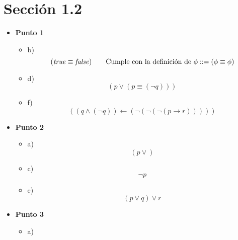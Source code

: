 \documentclass{article}
\begin{document}
\section{Sección 1.2}
\begin{itemize}
	\item \textbf{Punto 1}
	      \begin{itemize}
		      \item[] b)
			      \begin{equation*}
				      (\textrm{\textit{true}} \equiv \textrm{\textit{false}}) \tag*{Cumple con la definición de $\phi ::= (\phi \equiv \phi)$}
			      \end{equation*}
		      \item[] d)
			      \begin{equation*}
				      (p \vee (p \equiv (\lnot q))) \tag*{Cumple con la definición de $\phi ::= (\phi \vee \phi)$}
			      \end{equation*}
		      \item[] f)
			      \begin{equation*}
				      ((q \wedge (\lnot q))\leftarrow (\lnot(\lnot(\lnot(p \rightarrow r))))) \tag*{Cumple con la definición de $\phi ::= (\phi \leftarrow \phi)$}
			      \end{equation*}
	      \end{itemize}
	\item \textbf{Punto 2}
	      \begin{itemize}
		      \item[] a)
			      \begin{equation*}
				      (p \vee) \tag*{No se encuentra en la definición de $\phi$ (hace falta algún $\phi$ despues de $\vee$)}
			      \end{equation*}
		      \item[] c)
			      \begin{equation*}
				      \lnot p \tag*{No se encuentra en la definición de $\phi$ (hace falta cerrar todo con "()")}
			      \end{equation*}
		      \item[] e)
			      \begin{equation*}
				      (p \vee q) \vee r \tag*{No se encuentra en la definición de $\phi$ (hace falta cerrar todo con "()")}
			      \end{equation*}
	      \end{itemize}
	\item \textbf{Punto 3}
	      \begin{itemize}
		      \item[] a)

\end{itemize}
\end{itemize}
\end{document}
